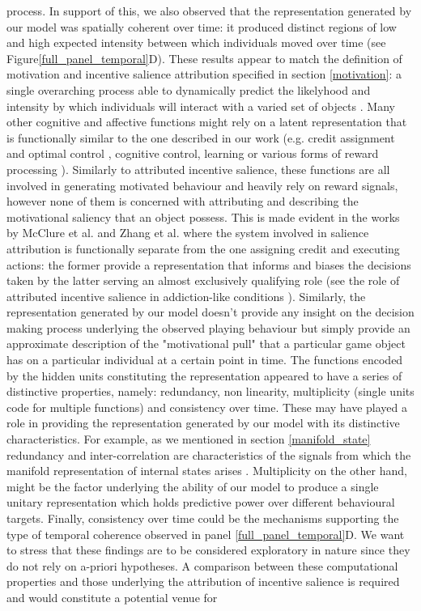 process. In support of this, we also observed that the representation generated by our model was spatially coherent over time: it produced distinct regions of low and high expected intensity between which individuals moved over time (see Figure\ref{full_panel_temporal}D). These results appear to match the definition of motivation and incentive salience attribution specified in section \ref{motivation}: a single overarching process able to dynamically predict the likelyhood and intensity by which individuals will interact with a varied set of objects \cite{simpson2016behavioral,toates1994comparing,berridge2004motivation,zhang2009neural}. Many other cognitive and affective functions might rely on a latent representation that is functionally similar to the one described in our work (e.g. credit assignment and optimal control \cite{wang2018prefrontal, barto2004reinforcement}, cognitive control, learning \cite{skinner1965science} or various forms of reward processing \cite{schultz1997neural, schultz2000reward}). Similarly to attributed incentive salience, these functions are all involved in generating motivated behaviour and heavily rely on reward signals, however none of them is concerned with attributing and describing the motivational saliency that an object possess. This is made evident in the works by McClure et al. \cite{mcclure2003computational} and Zhang et al. \cite{zhang2009neural} where the system involved in salience attribution is functionally separate from the one assigning credit and executing actions: the former provide a representation that informs and biases the decisions taken by the latter serving an almost exclusively qualifying role (see the role of attributed incentive salience in addiction-like conditions \cite{robinson1993neural}). Similarly, the representation generated by our model doesn't provide any insight on the decision making process underlying the observed playing behaviour but simply provide an approximate description of the "motivational pull" that a particular game object has on a particular individual at a certain point in time. The functions encoded by the hidden units constituting the representation appeared to have a series of distinctive properties, namely: redundancy, non linearity, multiplicity (single units code for multiple functions) and consistency over time. These may have played a role in providing the representation generated by our model with its distinctive characteristics. For example, as we mentioned in section \ref{manifold_state} redundancy and inter-correlation are characteristics of the signals from which the manifold representation of internal states arises \cite{seung2000manifold,gallego2017neural}. Multiplicity on the other hand, might be the factor underlying the ability of our model to produce a single unitary representation which holds predictive power over different behavioural targets. Finally, consistency over time could be the mechanisms supporting the type of temporal coherence observed in panel \ref{full_panel_temporal}D. We want to stress that these findings are to be considered exploratory in nature since they do not rely on a-priori hypotheses. A comparison between these computational properties and those underlying the attribution of incentive salience is required and would constitute a potential venue for 